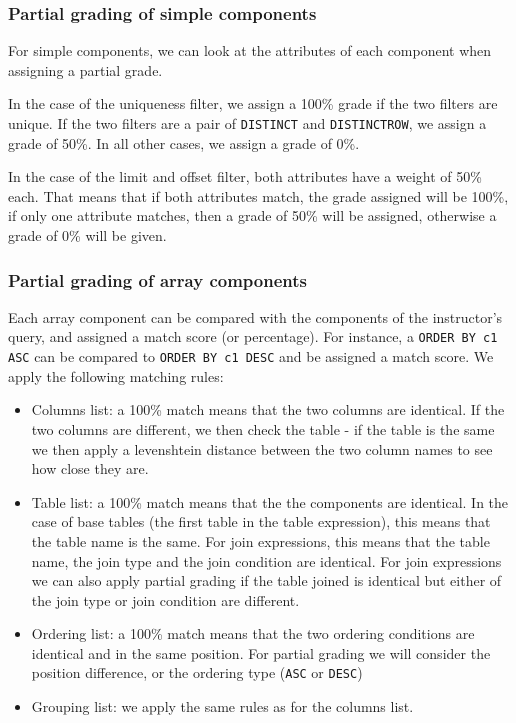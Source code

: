 \subsubsection{Partial grading of simple components}

For simple components, we can look at the attributes of each component when assigning a partial grade.

In the case of the uniqueness filter, we assign a 100\% grade if the two filters are unique. If the two filters are a pair of \texttt{DISTINCT} and \texttt{DISTINCTROW}, we assign a grade of 50\%. In all other cases, we assign a grade of 0\%.

In the case of the limit and offset filter, both attributes have a weight of 50\% each. That means that if both attributes match, the grade assigned will be 100\%, if only one attribute matches, then a grade of 50\% will be assigned, otherwise a grade of 0\% will be given.

\subsubsection{Partial grading of array components}

Each array component can be compared with the components of the instructor's query, and assigned a match score (or percentage). For instance, a \texttt{ORDER BY c1 ASC} can be compared to \texttt{ORDER BY c1 DESC} and be assigned a match score. We apply the following matching rules:

\begin{itemize}
    \item Columns list: a 100\% match means that the two columns are identical. If the two columns are different, we then check the table - if the table is the same we then apply a levenshtein distance between the two column names to see how close they are.
    \item Table list: a 100\% match means that the the components are identical. In the case of base tables (the first table in the table expression), this means that the table name is the same. For join expressions, this means that the table name, the join type and the join condition are identical. For join expressions we can also apply partial grading if the table joined is identical but either of the join type or join condition are different.
    \item Ordering list: a 100\% match means that the two ordering conditions are identical and in the same position. For partial grading we will consider the position difference, or the ordering type (\texttt{ASC} or \texttt{DESC})
    \item Grouping list: we apply the same rules as for the columns list.
\end{itemize}


